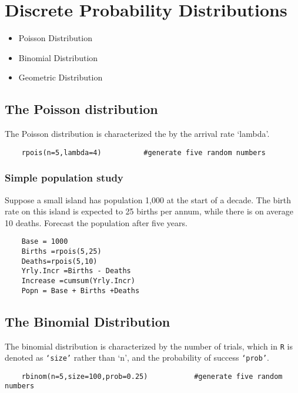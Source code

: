 
\section{Discrete Probability Distributions}
\begin{itemize}
\item Poisson Distribution
\item Binomial Distribution
\item Geometric Distribution
\end{itemize}
\subsection{The Poisson distribution}
The Poisson distribution is characterized the by the arrival rate ‘lambda’.
\begin{framed}
	\begin{verbatim}
	rpois(n=5,lambda=4)          #generate five random numbers
	\end{verbatim}
\end{framed} 
\subsubsection{Simple population study}

Suppose a small island has population 1,000 at the start of a decade. The birth rate on this island is expected to 25 births per annum, while there is on average 10 deaths.  Forecast the population after five years.

\begin{framed}
	\begin{verbatim}
	Base = 1000
	Births =rpois(5,25)
	Deaths=rpois(5,10)
	Yrly.Incr =Births - Deaths
	Increase =cumsum(Yrly.Incr)
	Popn = Base + Births +Deaths
	\end{verbatim}
\end{framed} 
\subsection{The Binomial Distribution}
The binomial distribution is characterized by the number of trials, which in \texttt{R} is denoted as \texttt{‘size’} rather than ‘n’, and the probability of success  \texttt{‘prob’}.
\begin{framed}
	\begin{verbatim}
	rbinom(n=5,size=100,prob=0.25)           #generate five random numbers
	\end{verbatim}
\end{framed} 
\newpage
